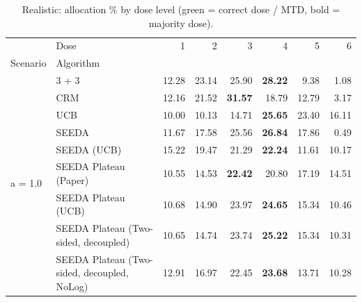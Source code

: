 \begin{table}[H]
\centering
\caption{Realistic: allocation \% by dose level (green = correct dose / MTD, bold = majority dose).}
\label{tab:real_alloc_by_dose}
\begin{tabular}{llrrrrrr}
\toprule
 & Dose & 1 & 2 & 3 & 4 & 5 & 6 \\
Scenario & Algorithm &  &  &  &  &  &  \\
\midrule
\multirow[c]{9}{*}{a = 1.0} & 3 + 3 & 12.28 & 23.14 & {\cellcolor[HTML]{C8E6C9}} 25.90 & \bfseries 28.22 & 9.38 & 1.08 \\
 & CRM & 12.16 & 21.52 & {\cellcolor[HTML]{C8E6C9}} \bfseries 31.57 & 18.79 & 12.79 & 3.17 \\
 & UCB & 10.00 & 10.13 & {\cellcolor[HTML]{C8E6C9}} 14.71 & \bfseries 25.65 & 23.40 & 16.11 \\
 & SEEDA & 11.67 & 17.58 & {\cellcolor[HTML]{C8E6C9}} 25.56 & \bfseries 26.84 & 17.86 & 0.49 \\
 & SEEDA (UCB) & 15.22 & 19.47 & {\cellcolor[HTML]{C8E6C9}} 21.29 & \bfseries 22.24 & 11.61 & 10.17 \\
 & SEEDA Plateau (Paper) & 10.55 & 14.53 & {\cellcolor[HTML]{C8E6C9}} \bfseries 22.42 & 20.80 & 17.19 & 14.51 \\
 & SEEDA Plateau (UCB) & 10.68 & 14.90 & {\cellcolor[HTML]{C8E6C9}} 23.97 & \bfseries 24.65 & 15.34 & 10.46 \\
 & SEEDA Plateau (Two-sided, decoupled) & 10.65 & 14.74 & {\cellcolor[HTML]{C8E6C9}} 23.74 & \bfseries 25.22 & 15.34 & 10.31 \\
 & SEEDA Plateau (Two-sided, decoupled, NoLog) & 12.91 & 16.97 & {\cellcolor[HTML]{C8E6C9}} 22.45 & \bfseries 23.68 & 13.71 & 10.28 \\
\bottomrule
\end{tabular}
\end{table}
